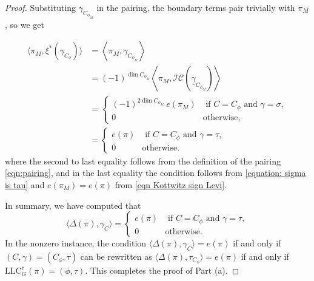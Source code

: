 \documentclass[11pt,letterpaper]{amsart}
\newcommand{\pure}{\mathrm{pure}}
\newcommand{\LLC}{\mathrm{LLC}}
\newcommand{\locsys}[2]{\underline{#1}_{#2}}
\newcommand{\stsh}[2]{{#1}_{#2}}
\renewcommand{\1}{\mathbbm{1}}
\numberwithin{equation}{section}
\begin{document}
{\begin{proof}
Substituting $\stsh{\gamma}{C_{\phi_M}}$ in the pairing, the boundary terms pair trivially with $\pi_M$, so we get

\begin{align}\label{eq pairing converse}
\nonumber \langle \pi_M, \xi^*(\stsh{\gamma}{C_\phi})\rangle 
&= \left\langle \pi_M, \stsh{\gamma}{C_{\phi_M}}\right\rangle \\
&= (-1)^{\dim C_{\phi_M}}\left\langle \pi_M, \mathcal{IC}\left(\locsys{\gamma}{C_{\phi_M}}\right)\right\rangle \\
 \nonumber &=\begin{cases}
    (-1)^{2\dim C_{\phi_M}}~e(\pi_M) & \text{ if } C=C_\phi \text{ and } \gamma=\sigma,\\
    0 & \text{otherwise,} 
\end{cases}\\
\nonumber   &= \begin{cases}
    e(\pi) & \text{ if } C=C_\phi \text{ and } \gamma=\tau,\\
    0 & \text{otherwise.}
    \end{cases}
\end{align}
where the second to last equality follows from the definition of the pairing \eqref{eqn:pairing}, and in the last equality the condition follows from \eqref{equation: sigma is tau} and $e(\pi_M)=e(\pi)$  from \eqref{eqn Kottwitz sign Levi}.

In summary, we have computed that
\[ \langle \Delta(\pi), \stsh{\gamma}{C} \rangle=\begin{cases}
    e(\pi) & \text{ if } C=C_\phi \text{ and } \gamma=\tau,\\
    0 & \text{otherwise.}
    \end{cases} \]
In the nonzero instance, the condition $\langle \Delta(\pi),{\stsh{\gamma}{C}}\rangle = e(\pi) $ if and only if $ (C,\gamma)=(C_\phi,\tau) $ can be rewritten as $\langle \Delta(\pi),\stsh{\tau}{C_\phi}\rangle = e(\pi) $ if and only if $ \LLC_G^{\mathfrak{e}}(\pi)=(\phi, \tau)$. This completes the proof of Part (a).



\end{proof}}
\end{document}
